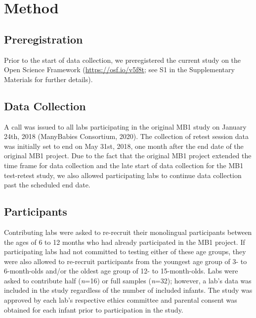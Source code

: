 \documentclass[
  man,floatsintext]{apa6}
\begin{document}
\hypertarget{method}{%
\section{Method}\label{method}}

\hypertarget{preregistration}{%
\subsection{Preregistration}\label{preregistration}}

Prior to the start of data collection, we preregistered the current study on the Open Science Framework (\url{https://osf.io/v5f8t}; see S1 in the Supplementary Materials for further details).

\hypertarget{data-collection}{%
\subsection{Data Collection}\label{data-collection}}

A call was issued to all labs participating in the original MB1 study on January 24th, 2018 (ManyBabies Consortium, 2020). The collection of retest session data was initially set to end on May 31st, 2018, one month after the end date of the original MB1 project. Due to the fact that the original MB1 project extended the time frame for data collection and the late start of data collection for the MB1 test-retest study, we also allowed participating labs to continue data collection past the scheduled end date.

\hypertarget{participants}{%
\subsection{Participants}\label{participants}}

Contributing labs were asked to re-recruit their monolingual participants between the ages of 6 to 12 months who had already participated in the MB1 project.
If participating labs had not committed to testing either of these age groups, they were also allowed to re-recruit participants from the youngest age group of 3- to 6-month-olds and/or the oldest age group of 12- to 15-month-olds.
Labs were asked to contribute half (\emph{n}=16) or full samples (\emph{n}=32); however, a lab's data was included in the study regardless of the number of included infants.
The study was approved by each lab's respective ethics committee and parental consent was obtained for each infant prior to participation in the study.
\end{document}
